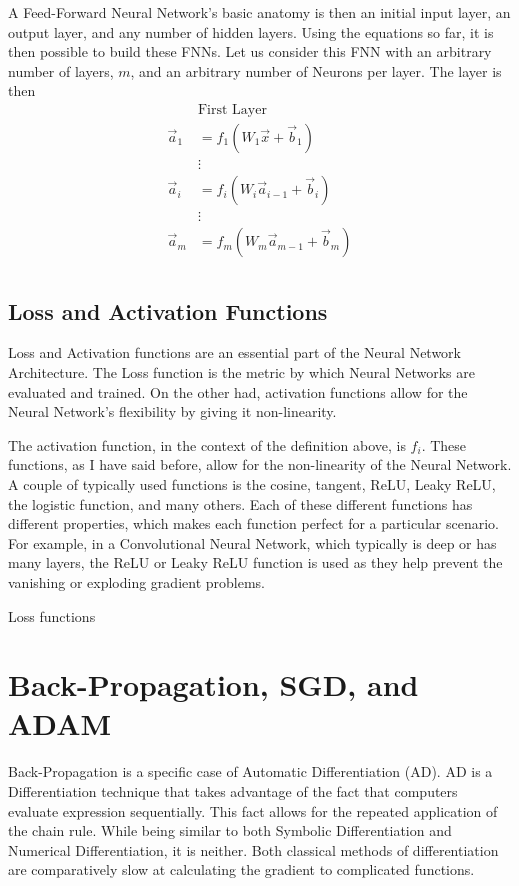 \documentclass{article}
\begin{document}
A Feed-Forward Neural Network's basic anatomy is then an initial input layer, an output layer, and any number of hidden layers. Using the equations so far, it is then possible to build these FNNs. Let us consider this FNN with an arbitrary number of layers, $m$, and an arbitrary number of Neurons per layer. The layer is then 
\begin{align*}
&\text{First Layer} \\
\vec{a}_1 &= f_1(W_1\vec{x} +\vec{b}_1 )\\
&\vdots\\
\vec{a}_i &= f_i(W_i\vec{a}_{i-1}+\vec{b}_i)\\
&\vdots\\
\vec{a}_m &= f_m(W_m\vec{a}_{m-1}+\vec{b}_m)\\
\end{align*}

\subsection{Loss and Activation Functions}

Loss and Activation functions are an essential part of the Neural Network Architecture. The Loss function is the metric by which Neural Networks are evaluated and trained. On the other had, activation functions allow for the Neural Network's flexibility by giving it non-linearity.

The activation function, in the context of the definition above, is $f_i$. These functions, as I have said before, allow for the non-linearity of the Neural Network. A couple of typically used functions is the cosine, tangent, ReLU, Leaky ReLU, the logistic function, and many others. Each of these different functions has different properties, which makes each function perfect for a particular scenario. For example, in a Convolutional Neural Network, which typically is deep or has many layers, the ReLU or Leaky ReLU function is used as they help prevent the vanishing or exploding gradient problems.

Loss functions

\section{Back-Propagation, SGD, and ADAM}

Back-Propagation is a specific case of Automatic Differentiation (AD). AD is a Differentiation technique that takes advantage of the fact that computers evaluate expression sequentially. This fact allows for the repeated application of the chain rule. While being similar to both Symbolic Differentiation and Numerical Differentiation, it is neither. Both classical methods of differentiation are comparatively slow at calculating the gradient to complicated functions. 
\end{document}
